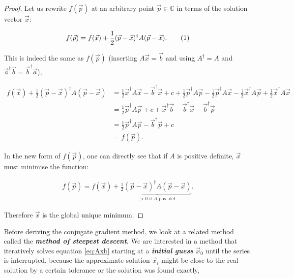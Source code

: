 \documentclass{article}
\newcommand\numberthis{\addtocounter{equation}{1}\tag{\theequation}}
\theoremstyle{plain} %
\theoremstyle{convention} %
\theoremstyle{remark} %
\def\df#1{\textbf{\textit{#1}}}
\numberwithin{equation}{section}
\begin{document}
\begin{proof}
Let us rewrite $f(\vec{p})$ at an arbitrary point $\vec{p} \in \mathbb{C}$ in terms of the solution vector $\vec{x}$:

\begin{align*}
    f(\vec{p}) = f(\vec{x}) + \frac{1}{2} (\vec{p} - \vec{x})^{\dagger} A (\vec{p} - \vec{x}). \numberthis \label{eq:fp_cgne}
\end{align*}

This is indeed the same as $f(\vec{p})$ (inserting $A \vec{x} = \vec{b}$ and using $A^{\dagger}=A$ and $\vec{a}^{\dagger} \vec{b} = \vec{b}^{\dagger} \vec{a}$),

\begin{align*}
f(\vec{x}) + \frac{1}{2} (\vec{p} - \vec{x})^{\dagger} A (\vec{p} - \vec{x}) &= \frac{1}{2} \vec{x}^{\dagger} A \vec{x} - \vec{b}^{\dagger} \vec{x} + c + \frac{1}{2} \vec{p}^{\dagger} A \vec{p} - \frac{1}{2} \vec{p}^{\dagger} A \vec{x} - \frac{1}{2} \vec{x}^{\dagger} A \vec{p} + \frac{1}{2} \vec{x}^{\dagger} A \vec{x} \\
&= \frac{1}{2} \vec{p}^{\dagger} A \vec{p} + c + \vec{x}^{\dagger} \vec{b} - \vec{b}^{\dagger} \vec{x} - \vec{b}^{\dagger} \vec{p} \\
&= \frac{1}{2} \vec{p}^{\dagger} A \vec{p} - \vec{b}^{\dagger} \vec{p} + c \\
&= f(\vec{p}).
\end{align*}

In the new form of $f(\vec{p})$, one can directly see that if $A$ is positive definite, $\vec{x}$ must minimise the function:

\begin{align*}
    f(\vec{p}) = f(\vec{x}) + \frac{1}{2} \underbrace{ (\vec{p} - \vec{x})^{\dagger} A (\vec{p} - \vec{x}) }_{\text{$> 0$ if $A$ pos. def.}}.
\end{align*}

Therefore $\vec{x}$ is the global unique minimum.

\end{proof}

Before deriving the conjugate gradient method, we look at a related method called the \df{method of steepest descent}. We are interested in a method that iteratively solves equation \eqref{eq:Axb} starting at a \df{initial guess} $\vec{x}_0$ until the series is interrupted, because the approximate solution $\vec{x}_i$ might be close to the real solution by a certain tolerance or the solution was found exactly,
\end{document}
